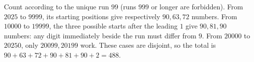 Count according to the unique run $99$ (runs $999$ or longer are forbidden). From $2025$ to $9999$, its starting positions give respectively $90,63,72$ numbers. From $10000$ to $19999$, the three possible starts after the leading $1$ give $90,81,90$ numbers: any digit immediately beside the run must differ from $9$. From $20000$ to $20250$, only $20099,20199$ work. These cases are disjoint, so the total is $90+63+72+90+81+90+2=\boxed{488}$.
